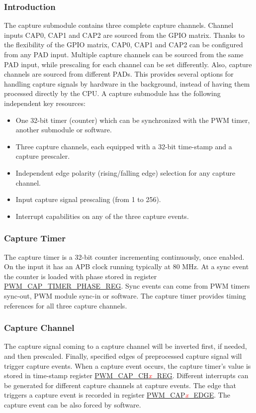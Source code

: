 \documentclass[main\_\_EN.tex]{subfiles}
\begin{document}
\subsubsection{Introduction}
The capture submodule contains three complete capture channels. Channel inputs CAP0, CAP1 and CAP2 are sourced from the GPIO matrix. Thanks to the flexibility of the GPIO matrix, CAP0, CAP1 and CAP2 can be configured from any PAD input. Multiple capture channels can be sourced from the same PAD input, while prescaling for each channel can be set differently. Also, capture channels are sourced from different PADs. This provides several options for handling capture signals by hardware in the background, instead of having them processed directly by the CPU.
A capture submodule has the following independent key resources:
\begin{itemize}
    \item One 32-bit timer (counter) which can be synchronized with the PWM timer, another submodule or software.
    \item Three capture channels, each equipped with a 32-bit time-stamp and a capture prescaler.
    \item Independent edge polarity (rising/falling edge) selection for any capture channel.
    \item Input capture signal prescaling (from 1 to 256).
    \item Interrupt capabilities on any of the three capture events.
\end{itemize}

\subsubsection{Capture Timer}
The capture timer is a 32-bit counter incrementing continuously, once enabled. On the input it has an APB clock running typically at 80 MHz. At a sync event the counter is loaded with phase stored in register\\\hyperref[regdesc:PWMCAPTIMERPHASEREG]{PWM\_CAP\_TIMER\_PHASE\_REG}. Sync events can come from PWM timers sync-out, PWM module sync-in or software. The capture timer provides timing references for all three capture channels.

\subsubsection{Capture Channel}
The capture signal coming to a capture channel will be inverted first, if needed, and then prescaled. Finally, specified edges of preprocessed capture signal will trigger capture events. When a capture event occurs, the capture timer's value is stored in time-stamp register \hyperref[regdesc:PWMCAPCH0REG]{PWM\_CAP\_CH\textcolor{red}{\it{x}}\_REG}. Different interrupts can be generated for different capture channels at capture events. The edge that triggers a capture event is recorded in register \hyperref[regdesc:PWMCAPSTATUSREG]{PWM\_CAP\textcolor{red}{\it{x}}\_EDGE}. The capture event can be also forced by software.
\end{document}
